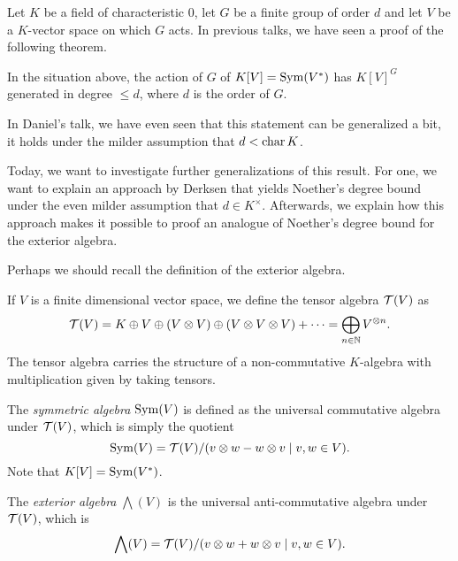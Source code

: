 \documentclass[../main.tex]{subfiles}
\begin{document}
Let $K$ be a field of characteristic $0$, let $G$ be a finite group of order $d$
and let $V$ be a $K$-vector space on which $G$ acts. In previous talks, we have 
seen a proof of the following theorem.

\begin{thm} \label{thm:classical}
    In the situation above, the action of $G$ of $K[V] = \operatorname{Sym}(V^*)$ has $K[V]^G$ generated
    in degree $\leq d$, where $d$ is the order of $G$.
\end{thm}

In Daniel's talk, we have even seen that this statement can be generalized a bit,
it holds under the milder assumption that $d < \operatorname{char} K$. 

Today, we want to investigate further generalizations of this result. 
For one, we want to explain an approach by Derksen \cite{DERKSENProofIdea} that
yields Noether's degree bound under the even milder assumption that $d \in
K^\times$. Afterwards, we explain how this approach makes it possible to
proof an analogue of Noether's degree bound for the exterior algebra.

Perhaps we should recall the definition of the exterior algebra.
\begin{defi}
    If $V$ is a finite dimensional vector space, we define the tensor algebra
    $\mathcal{T}(V)$ as 
    \begin{equation*}
        \mathcal{T}(V) = K \oplus V \oplus (V \otimes V) \oplus (V \otimes V \otimes V) + \dots
        = \bigoplus_{n \in \mathbb{N}} V^{\otimes n}.
    \end{equation*}
    The tensor algebra carries the structure of a non-commutative $K$-algebra with
    multiplication given by taking tensors. 

    The \emph{symmetric algebra} $\operatorname{Sym}(V)$ is defined as the universal
    commutative algebra under $\mathcal{T}(V)$, which is simply the quotient
    \begin{equation*}
        \operatorname{Sym}(V) = \mathcal{T}(V)/(v \otimes w - w\otimes v \mid v,w \in V).
    \end{equation*}
    Note that $K[V] = \operatorname{Sym}(V^*)$.

    The \emph{exterior algebra} $\bigwedge(V)$ is the universal anti-commutative
    algebra under $\mathcal{T}(V)$, which is 
    \begin{equation*}
        \bigwedge(V) = \mathcal{T}(V)/(v \otimes w + w\otimes v \mid v,w \in V).
    \end{equation*}
\end{defi}
\end{document}
